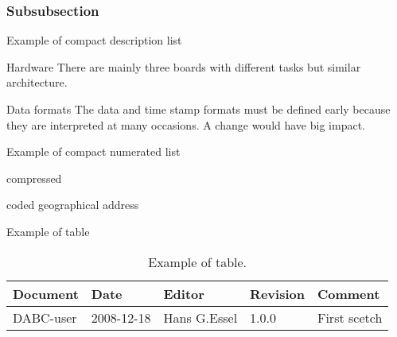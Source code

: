 \subsubsection{Subsubsection}

Example of compact description list
\begin{compactdesc}
\item[Hardware] There are mainly three boards with different tasks but similar architecture.
\item[Data formats] The data and time stamp formats must be defined early because they are
interpreted at many occasions. A change would have big impact.
\end{compactdesc}

Example of compact numerated list
\begin{compactenum}
\item compressed
\item coded geographical address
\end{compactenum}

Example of table
\begin{table}[h]
\begin{tabular}{|p{2.0cm}|p{2.0cm}|p{3.0cm}|p{1.6cm}|p{5.0cm}|}      \hline
Document   & Date        & Editor       & Revision & Comment      \\ \hline
DABC-user & 2008-12-18 & Hans G.Essel & 1.0.0      & First scetch \\ \hline
\end{tabular}
\caption{Example of table.}
\label{user-table}
\end{table}
